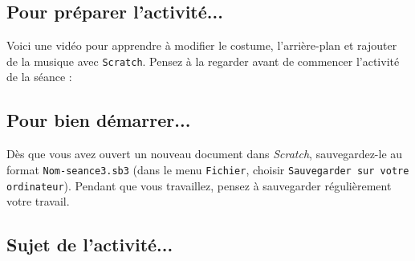 \vspace{20pt}

\subsection{Pour préparer l'activité...}

Voici une vidéo pour apprendre à modifier le costume, l'arrière-plan et rajouter de la musique avec \texttt{Scratch}. Pensez à la regarder avant de commencer l'activité de la séance :

\begin{center}
\end{center}

\vspace{20pt}

\subsection{Pour bien démarrer...}

Dès que vous avez ouvert un nouveau document dans \emph{Scratch}, sauvegardez-le au format \texttt{Nom-seance3.sb3} (dans le menu \texttt{Fichier}, choisir \texttt{Sauvegarder sur votre ordinateur}). Pendant que vous travaillez, pensez à sauvegarder régulièrement votre travail.   


\vspace{20pt}

\subsection{Sujet de l'activité...}

\vspace{10pt}

